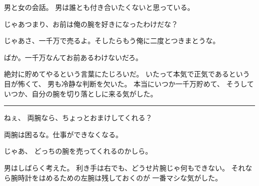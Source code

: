 \documentclass[]{book}
\begin{document}
男と女の会話。 男は誰とも付き合いたくないと思っている。

じゃあつまり、お前は俺の腕を好きになったわけだな？

じゃあさ、一千万で売るよ。そしたらもう俺に二度とつきまとうな。

ばか。一千万なんてお前あるわけないだろ。

絶対に貯めてやるという言葉にたじろいだ。
いたって本気で正気であるという目が怖くて、 男も冷静な判断を欠いた。
本当にいつか一千万貯めて、
そうしていつか、自分の腕を切り落としに来る気がした。

\begin{center}\rule{3in}{0.4pt}\end{center}

ねぇ、 両腕なら、ちょっとおまけしてくれる？

両腕は困るな。仕事ができなくなる。

じゃあ、 どっちの腕を売ってくれるのかしら。

男はしばらく考えた。 利き手は右でも、どうせ片腕じゃ何もできない。
それなら腕時計をはめるための左腕は残しておくのが 一番マシな気がした。
\end{document}
